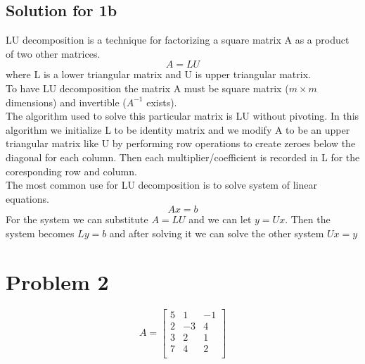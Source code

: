 \documentclass[a4paper,fleqn,12pt]{article}
\begin{document}
\subsection{Solution for 1b}
LU decomposition is a technique for factorizing a square matrix A as a product of two other matrices. 
$$
A = LU
$$
where L is a lower triangular matrix and U is upper triangular matrix. \\
To have LU decomposition the matrix A must be square matrix ($m \times m$ dimensions) and invertible ($A^{-1}$ exists).  \\
The algorithm used to solve this particular matrix is LU without pivoting. 
In this algorithm we initialize L to be identity matrix and we modify A to be an upper triangular matrix like U by performing row operations to create zeroes below the diagonal for each column. Then each multiplier/coefficient is recorded in L for the coresponding row and column. \\
The most common use for LU decomposition is to solve system of linear equations. 
$$
Ax = b 
$$
For the system we can substitute $A = LU$ and we can let $y = Ux$. Then the system becomes $Ly = b$ and after solving it we can solve the other system $Ux = y$

\newpage

\section{Problem 2}
$$
A = \begin{bmatrix}
	5 & 1 & -1 \\
	2 & -3 & 4 \\
	3 & 2 & 1 \\
	7 & 4 & 2 \\
\end{bmatrix}
$$
\end{document}
